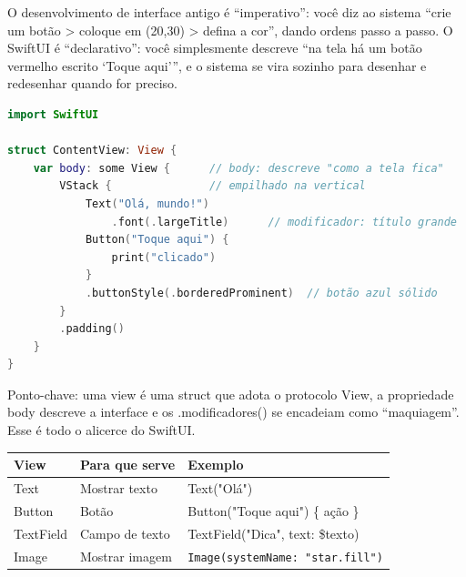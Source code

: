 


O desenvolvimento de interface antigo é “imperativo”: você diz ao sistema “crie um botão > coloque em (20,30) > defina a cor”, dando ordens passo a passo. O SwiftUI é “declarativo”: você simplesmente descreve “na tela há um botão vermelho escrito ‘Toque aqui’”, e o sistema se vira sozinho para desenhar e redesenhar quando for preciso.

\begin{lstlisting}[language=Swift]
import SwiftUI

struct ContentView: View {
    var body: some View {      // body: descreve "como a tela fica"
        VStack {               // empilhado na vertical
            Text("Olá, mundo!")
                .font(.largeTitle)      // modificador: título grande
            Button("Toque aqui") {
                print("clicado")
            }
            .buttonStyle(.borderedProminent)  // botão azul sólido
        }
        .padding()
    }
}
\end{lstlisting}

Ponto-chave: uma view é uma struct que adota o protocolo View, a propriedade body descreve a interface e os .modificadores() se encadeiam como “maquiagem”. Esse é todo o alicerce do SwiftUI.


\begin{center}
\begin{tabularx}{\linewidth}{|X|X|X|}
\hline
\textbf{View} & \textbf{Para que serve} & \textbf{Exemplo} \tabularnewline
\hline
Text & Mostrar texto & Text("Olá") \tabularnewline
Button & Botão & Button("Toque aqui") \{ ação \} \tabularnewline
TextField & Campo de texto & TextField("Dica", text: \$texto) \tabularnewline
Image & Mostrar imagem & \texttt{Image(systemName: "star.\allowbreak fill")} \tabularnewline
\hline
\end{tabularx}
\end{center}

